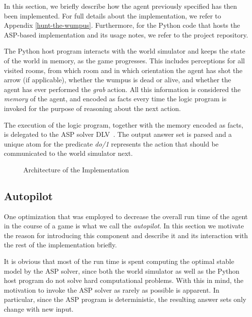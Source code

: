 \documentclass{llncs}
\begin{document}
In this section, we briefly describe how the agent previously specified has then been implemented.
For full details about the implementation, we refer to Appendix \ref{hunt-the-wumpus}.
Furthermore, for the Python code that hosts the ASP-based implementation and its usage notes, we refer to the project repository.

The Python host program interacts with the world simulator and keeps the state of the world in memory, as the game progresses. This includes perceptions for all visited rooms, from which room and in which orientation the agent has shot the arrow (if applicable), whether the wumpus is dead or alive, and whether the agent has ever performed the \emph{grab} action. All this information is considered the \emph{memory} of the agent, and encoded as facts every time the logic program is invoked for the purpose of reasoning about the next action.

The execution of the logic program, together with the memory encoded as facts, is delegated to the ASP solver DLV~\cite{DLV-system}.
The output answer set is parsed and a unique atom for the predicate \emph{do/1} represents the action that should be communicated to the world simulator next.

\begin{figure}
\begin{center}

\end{center}
\caption{Architecture of the Implementation}
\label{fig:architecture}
\end{figure}

\subsection{Autopilot}

One optimization that was employed to decrease the overall run time of the agent in the course of a game is what we call the \emph{autopilot}. In this section we motivate the reason for introducing this component and describe it and its interaction with the rest of the implementation briefly.

It is obvious that most of the run time is spent computing the optimal stable model by the ASP solver, since both the world simulator as well as the Python host program do not solve hard computational problems. With this in mind, the motivation to invoke the ASP solver as rarely as possible is apparent. In particular, since the ASP program is deterministic, the resulting answer sets only change with new input.
\end{document}
